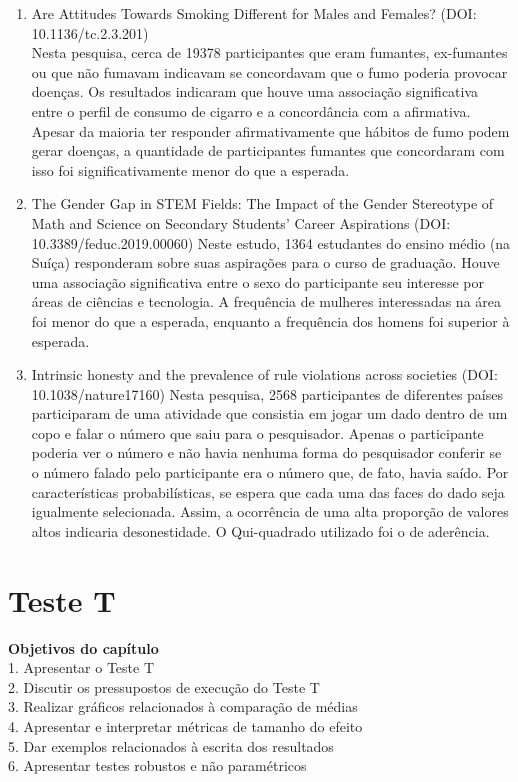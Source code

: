 \documentclass[
]{book}
\begin{document}
\begin{enumerate}
\def\labelenumi{\arabic{enumi}.}
\item
  Are Attitudes Towards Smoking Different for Males and Females? (DOI: 10.1136/tc.2.3.201)\\
  Nesta pesquisa, cerca de 19378 participantes que eram fumantes, ex-fumantes ou que não fumavam indicavam se concordavam que o fumo poderia provocar doenças. Os resultados indicaram que houve uma associação significativa entre o perfil de consumo de cigarro e a concordância com a afirmativa. Apesar da maioria ter responder afirmativamente que hábitos de fumo podem gerar doenças, a quantidade de participantes fumantes que concordaram com isso foi significativamente menor do que a esperada.
\item
  The Gender Gap in STEM Fields: The Impact of the Gender Stereotype of Math and Science on Secondary Students' Career Aspirations (DOI: 10.3389/feduc.2019.00060)
  Neste estudo, 1364 estudantes do ensino médio (na Suíça) responderam sobre suas aspirações para o curso de graduação. Houve uma associação significativa entre o sexo do participante seu interesse por áreas de ciências e tecnologia. A frequência de mulheres interessadas na área foi menor do que a esperada, enquanto a frequência dos homens foi superior à esperada.
\item
  Intrinsic honesty and the prevalence of rule violations across societies (DOI: 10.1038/nature17160)
  Nesta pesquisa, 2568 participantes de diferentes países participaram de uma atividade que consistia em jogar um dado dentro de um copo e falar o número que saiu para o pesquisador. Apenas o participante poderia ver o número e não havia nenhuma forma do pesquisador conferir se o número falado pelo participante era o número que, de fato, havia saído. Por características probabilísticas, se espera que cada uma das faces do dado seja igualmente selecionada. Assim, a ocorrência de uma alta proporção de valores altos indicaria desonestidade. O Qui-quadrado utilizado foi o de aderência.
\end{enumerate}

\hypertarget{teste-t}{%
\chapter{Teste T}\label{teste-t}}

\begin{objectives}
\textbf{Objetivos do capítulo}\\
1. Apresentar o Teste T\\
2. Discutir os pressupostos de execução do Teste T\\
3. Realizar gráficos relacionados à comparação de médias\\
4. Apresentar e interpretar métricas de tamanho do efeito\\
5. Dar exemplos relacionados à escrita dos resultados\\
6. Apresentar testes robustos e não paramétricos
\end{objectives}
\end{document}
